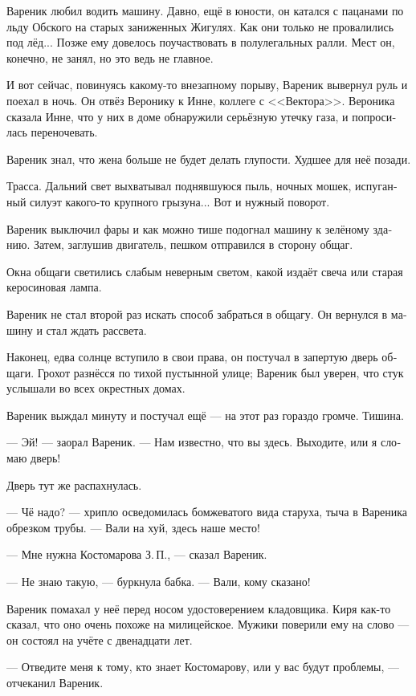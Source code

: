 \documentclass[a5paper,12pt,fleqn]{extbook}\usepackage{cooltooltips}\usepackage{polyglossia}\setdefaultlanguage[babelshorthands=true]{russian}\setotherlanguage{english}\defaultfontfeatures{Ligatures=TeX,Mapping=tex-text} \usepackage{xcolor}\definecolor{lightgray}{HTML}{bbbbbb}\color{lightgray}\newcommand{\ml}[3]{\textenglish{\textcolor{black}{#3}}}
\newcommand{\textspace}{\vspace{1em}{\centering\Large\bfseries<...>\par}\vspace{1em}}
\begin{document}
\textspace

Вареник любил водить машину.
Давно, ещё в юности, он катался с пацанами по льду Обского на старых заниженных Жигулях.
Как они только не провалились под лёд...
Позже ему довелось поучаствовать в полулегальных ралли.
Мест он, конечно, не занял, но это ведь не главное.

И вот сейчас, повинуясь какому-то внезапному порыву, Вареник вывернул руль и поехал в ночь.
Он отвёз Веронику к Инне, коллеге с <<Вектора>>.
Вероника сказала Инне, что у них в доме обнаружили серьёзную утечку газа, и попросилась переночевать.

Вареник знал, что жена больше не будет делать глупости.
Худшее для неё позади.

Трасса.
Дальний свет выхватывал поднявшуюся пыль, ночных мошек, испуганный силуэт какого-то крупного грызуна...
Вот и нужный поворот.

Вареник выключил фары и как можно тише подогнал машину к зелёному зданию.
Затем, заглушив двигатель, пешком отправился в сторону общаг.

Окна общаги светились слабым неверным светом, какой издаёт свеча или старая керосиновая лампа.

Вареник не стал второй раз искать способ забраться в общагу.
Он вернулся в машину и стал ждать рассвета.

Наконец, едва солнце вступило в свои права, он постучал в запертую дверь общаги.
Грохот разнёсся по тихой пустынной улице;
Вареник был уверен, что стук услышали во всех окрестных домах.

Вареник выждал минуту и постучал ещё --- на этот раз гораздо громче.
Тишина.

--- Эй! --- заорал Вареник.
--- Нам известно, что вы здесь.
Выходите, или я сломаю дверь!

Дверь тут же распахнулась.

--- Чё надо? --- хрипло осведомилась бомжеватого вида старуха, тыча в Вареника обрезком трубы.
--- Вали на хуй, здесь наше место!

--- Мне нужна Костомарова З.\,П., --- сказал Вареник.

--- Не знаю такую, --- буркнула бабка.
--- Вали, кому сказано!

Вареник помахал у неё перед носом удостоверением кладовщика.
Киря как-то сказал, что оно очень похоже на милицейское.
Мужики поверили ему на слово --- он состоял на учёте с двенадцати лет.

--- Отведите меня к тому, кто знает Костомарову, или у вас будут проблемы, --- отчеканил Вареник.
\end{document}
